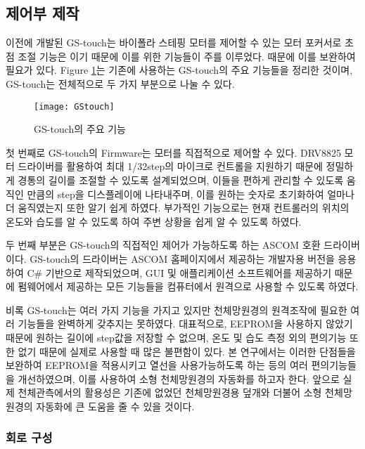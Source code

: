 \newpage
\subsection{제어부 제작}

이전에 개발된 GS-touch는 바이폴라 스테핑 모터를 제어할 수 있는 모터 포커서로 초점 조절 기능은 이기 때문에 이를 위한 기능들이 주를 이루었다. 때문에 이를 보완하여 필요가 있다. \textrm{Figure} \ref{GStocuh}는 기존에 사용하는 GS-touch의 주요 기능들을 정리한 것이며, GS-touch는 전체적으로 두 가지 부분으로 나눌 수 있다.

\bigskip
\begin{figure}[h]
	\begin{center}
		\texttt{[image: GStouch]}
	\end{center}
	\caption{GS-touch의 주요 기능}
	\label{GStocuh}
\end{figure}

첫 번째로 GS-touch의 Firmware는 모터를 직접적으로 제어할 수 있다. DRV8825 모터 드라이버를 활용하여 최대 1/32step의 마이크로 컨트롤을 지원하기 때문에 정밀하게 경통의 길이를 조절할 수 있도록 설계되었으며, 이들을 편하게 관리할 수 있도록 움직인 만큼의 step을 디스플레이에 나타내주며, 이를 원하는 숫자로 초기화하여 얼마나 더 움직였는지 또한 알기 쉽게 하였다. 부가적인 기능으로는 현재 컨트롤러의 위치의 온도와 습도를 알 수 있도록 하여 주변 상황을 쉽게 알 수 있도록 하였다.

두 번째 부분은 GS-touch의 직접적인 제어가 가능하도록 하는 ASCOM 호환 드라이버이다. GS-touch의 드라이버는 ASCOM 홈페이지에서 제공하는 개발자용 버전을 응용하여 C\# 기반으로 제작되었으며, GUI 및 애플리케이션 소프트웨어를 제공하기 때문에 펌웨어에서 제공하는 모든 기능들을 컴퓨터에서 원격으로 사용할 수 있도록 하였다.

비록 GS-touch는 여러 가지 기능을 가지고 있지만 천체망원경의 원격조작에 필요한 여러 기능들을 완벽하게 갖추지는 못하였다. 대표적으로, EEPROM을 사용하지 않았기 때문에 원하는 길이에 step값을 저장할 수 없으며, 온도 및 습도 측정 외의 편의기능 또한 없기 때문에 실제로 사용할 때 많은 불편함이 있다. 본 연구에서는 이러한 단점들을 보완하여 EEPROM을 적용시키고 열선을 사용가능하도록 하는 등의 여러 편의기능들을 개선하였으며, 이를 사용하여 소형 천체망원경의 자동화를 하고자 한다. 앞으로 실제 천체관측에서의 활용성은 기존에 없었던 천체망원경용 덮개와 더불어 소형 천체망원경의 자동화에 큰 도움을 줄 수 있을 것이다.

\subsubsection{회로 구성}

